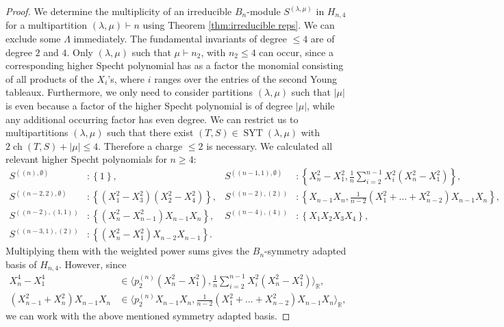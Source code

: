 \documentclass[11pt,a4paper]{amsart}
\numberwithin{equation}{section}
\theoremstyle{definition}
\newcommand{\R}{\mathbb{R}}
\DeclareMathOperator{\ch}{ch}
\DeclareMathOperator{\SYT}{SYT}
\numberwithin{thm}{section}
\theoremstyle{break}
\numberwithin{subcase}{case}
\begin{document}
\begin{proof}
We determine the multiplicity of an irreducible $B_n$-module $S^{(\lambda,\mu)}$ in $H_{n,4}$ for a multipartition $(\lambda,\mu) \vdash n$ using Theorem \ref{thm:irreducible reps}. We can exclude some $\Lambda$ immediately. The fundamental invariants of degree $\leq 4$ are of degree $2$ and $4$. Only $(\lambda,\mu)$ such that $\mu \vdash n_2$, with $n_2 \leq 4$ can occur, since a corresponding higher Specht polynomial has as a factor the monomial consisting of all products of the $X_i$'s, where $i$ ranges over the entries of the second Young tableaux. Furthermore, we only need to consider partitions $(\lambda,\mu)$ such that $|\mu|$ is even because a factor of the higher Specht polynomial is of degree $|\mu|$, while any additional occurring factor has even degree. We can restrict us to multipartitions $(\lambda,\mu)$ such that there exist $(T,S) \in \SYT (\lambda,\mu)$ with $2\ch (T,S) +|\mu| \leq 4 $. Therefore a charge $\leq 2$ is necessary. We calculated all relevant higher Specht polynomials for $n \geq 4$:
\begin{align*}
     S^{((n),\emptyset)} & : \left\{1\right\},& 
     S^{((n-1,1),\emptyset)} & :\left\{ X_n^2-X_1^2,\frac{1}{n}\sum_{i=2}^{n-1}X_i^2(X_n^2-X_1^2)\right\}, \\
     S^{((n-2,2),\emptyset)} & : \left\{(X_1^2-X_3^2)(X_2^2-X_4^2)\right\}, &
     S^{((n-2),(2))} & : \left\{X_{n-1}X_n, \frac{1}{n-2}(X_1^2+\ldots+X_{n-2}^2)X_{n-1}X_n\right\}, \\
     S^{((n-2),(1,1))} & : \left\{(X_n^2-X_{n-1}^2)X_{n-1}X_n\right\},& 
     S^{((n-4),(4))} & : \left\{X_1X_2X_3X_4\right\}, \\
     S^{((n-3,1),(2))} & : \left\{(X_n^2-X_1^2)X_{n-2}X_{n-1}\right\}.
\end{align*}
Multiplying them with the weighted power sums gives the $B_n$-symmetry adapted basis of $H_{n,4}$.
However, since \begin{align*}
X_n^4-X_1^4 &\in \langle p_2^{(n)}(X_n^2-X_1^2),\frac{1}{n}\sum_{i=2}^{n-1}X_i^2(X_n^2-X_1^2) \rangle_\R,  \\
(X_{n-1}^2+X_n^2)X_{n-1}X_n &\in \langle
     p_2^{(n)} X_{n-1}X_n, \frac{1}{n-2}(X_1^2+\ldots+X_{n-2}^2)X_{n-1}X_n \rangle_\R,
\end{align*} we can work with the above mentioned symmetry adapted basis. 
\end{proof}
\end{document}
